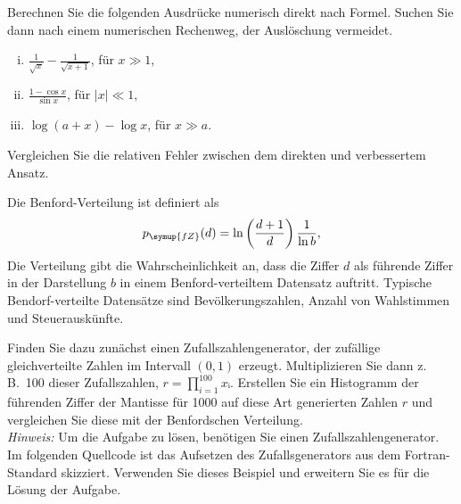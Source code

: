 
\NewDocumentCommand{}
\date{Ausgabe: Di, 9.4.2019, Besprechung: Fr, 12.4.2019}


\maketitle

\begin{question}[subtitle=Rundungsfehler]
  Berechnen Sie die folgenden Ausdrücke numerisch direkt nach Formel.
  Suchen Sie dann nach einem numerischen Rechenweg, der Auslöschung vermeidet.
  \begin{enumerate}[(i)]
  \item $\frac{1}{\sqrt{x}} - \frac{1}{\sqrt{x + 1}}$, für $x ≫ 1$,
  \item $\frac{1 - \cos x}{\sin x}$, für $|x| ≪ 1 $,
  \item $\log (a + x) - \log x$, für $x ≫ a$.
  \end{enumerate}
  Vergleichen Sie die relativen Fehler zwischen dem direkten und verbessertem Ansatz.
\end{question}

\begin{question}[subtitle=Benfordsches Gesetz]
  Die Benford-Verteilung ist definiert als
  \begin{equation}
    \label{eq:benford}
    p_{\symup{fZ}}(d) = \ln \left( \frac{d + 1}{d}\right) \frac{1}{\ln b},
  \end{equation}
  Die Verteilung gibt die Wahrscheinlichkeit an, dass die Ziffer $d$ als führende Ziffer in der Darstellung $b$ in einem Benford-verteiltem Datensatz auftritt.
  Typische Bendorf-verteilte Datensätze sind Bevölkerungszahlen, Anzahl von Wahlstimmen und Steuerauskünfte.

  Finden Sie dazu zunächst einen Zufallszahlengenerator, der zufällige gleichverteilte Zahlen im Intervall $(0, 1)$ erzeugt.
  Multiplizieren Sie dann z.\,B.\ \num{100} dieser Zufallszahlen, $r = \prod_{i = 1}^{100} xᵢ$.
  Erstellen Sie ein Histogramm der führenden Ziffer der Mantisse für \num{1000} auf diese Art generierten Zahlen $r$ und vergleichen Sie diese mit der Benfordschen Verteilung.\\[1.5em]

  \textit{Hinweis:} Um die Aufgabe zu lösen, benötigen Sie einen Zufallszahlengenerator.
  Im folgenden Quellcode ist das Aufsetzen des Zufallsgenerators aus dem Fortran-Standard skizziert.
  Verwenden Sie dieses Beispiel und erweitern Sie es für die Lösung der Aufgabe.
  \inputminted{fortran}{../src/aufgabe02.f90}
\end{question}

